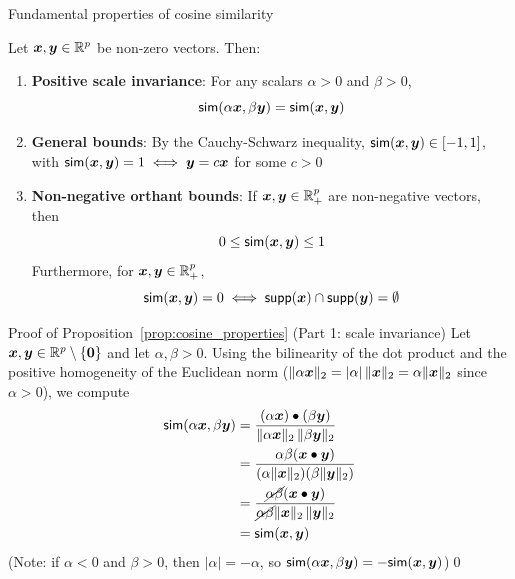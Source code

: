 \documentclass[aspectratio=169]{beamer}\usepackage[]{graphicx}\usepackage[]{xcolor}
\begin{document}
\begin{frame}{Fundamental properties of cosine similarity}
\begin{proposition}\label{prop:cosine_properties}
Let $\bm{x}, \bm{y} \in \mathbb{R}^p$ be non-zero vectors. Then:
\begin{enumerate}
\item \textbf{Positive scale invariance}: For any scalars $\alpha > 0$ and $\beta > 0$,
\[
\mathsf{sim}(\alpha \bm{x}, \beta \bm{y}) = \mathsf{sim}(\bm{x}, \bm{y})
\]
\item \textbf{General bounds}: By the Cauchy-Schwarz inequality, $\mathsf{sim}(\bm{x}, \bm{y}) \in [-1, 1]$, with $\mathsf{sim}(\bm{x}, \bm{y}) = 1 \iff \bm{y} = c\bm{x}$ for some $c > 0$
\item \textbf{Non-negative orthant bounds}: If $\bm{x}, \bm{y} \in \mathbb{R}_+^p$ are non-negative vectors, then
\[
0 \le \mathsf{sim}(\bm{x}, \bm{y}) \le 1
\]
Furthermore, for $\bm{x}, \bm{y} \in \mathbb{R}_+^p$,
\[
\mathsf{sim}(\bm{x}, \bm{y}) = 0 \iff \mathsf{supp}(\bm{x}) \cap \mathsf{supp}(\bm{y}) = \emptyset
\]
\end{enumerate}
\end{proposition}
\end{frame}


\begin{frame}[red]{Proof of Proposition~\ref{prop:cosine_properties} (Part 1: scale invariance)}
Let $\bx, \by \in \IR^p \setminus \{\b0\}$ and let $\alpha, \beta > 0$. Using the bilinearity of the dot product and the positive homogeneity of the Euclidean norm ($\|\alpha \bm{x}\|_2 = |\alpha|\,\|\bm{x}\|_2 = \alpha \|\bm{x}\|_2$ since $\alpha > 0$), we compute
\begin{align*}
\mathsf{sim}(\alpha \bm{x}, \beta \bm{y})
&= \frac{(\alpha \bm{x}) \bullet (\beta \bm{y})}{\|\alpha \bm{x}\|_2 \, \|\beta \bm{y}\|_2} \\
&= \frac{\alpha \beta (\bm{x} \bullet \bm{y})}{(\alpha \|\bm{x}\|_2)(\beta \|\bm{y}\|_2)} \\
&= \frac{\cancel{\alpha \beta}(\bm{x} \bullet \bm{y})}{\cancel{\alpha \beta}\|\bm{x}\|_2 \, \|\bm{y}\|_2} \\
&= \mathsf{sim}(\bm{x}, \bm{y})
\end{align*}
\vfill
(Note: if $\alpha < 0$ and $\beta > 0$, then $|\alpha| = -\alpha$, so $\mathsf{sim}(\alpha\bm{x}, \beta\bm{y}) = -\mathsf{sim}(\bm{x}, \bm{y})$)\hfill\qed
\end{frame}
\end{document}
